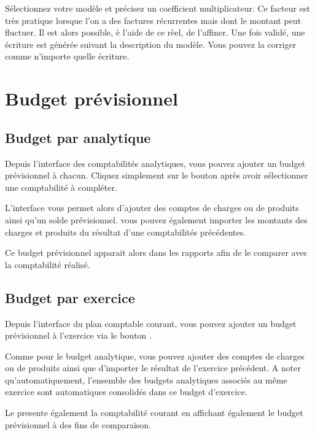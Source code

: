 \documentclass[a4paper,10pt,oneside,french]{sphinxmanual}
\begin{document}
Sélectionnez votre modèle et précisez un coefficient multiplicateur. Ce facteur est très pratique lorsque l’on a des factures récurrentes mais dont le montant peut fluctuer. Il est alors possible, è l’aide de ce rèel, de l’affiner.
Une fois validé, une écriture est générée suivant la description du modèle. Vous pouvez la corriger comme n’importe quelle écriture.


\section{Budget prévisionnel}
\label{\detokenize{accounting/budget::doc}}\label{\detokenize{accounting/budget:budget-previsionnel}}

\subsection{Budget par analytique}
\label{\detokenize{accounting/budget:budget-par-analytique}}
Depuis l’interface des comptabilités analytiques, vous pouvez ajouter un budget prévisionnel à chacun.
Cliquez simplement sur le bouton  après avoir sélectionner une comptabilité à compléter.

L’interface vous permet alors d’ajouter des comptes de charges ou de produits ainsi qu’un solde prévisionnel.
vous pouvez également importer les montants des charges et produits du résultat d’une comptabilités précédentes.

Ce budget prévisionnel apparait alors dans les rapports afin de le comparer avec la comptabilité réalisé.


\subsection{Budget par exercice}
\label{\detokenize{accounting/budget:budget-par-exercice}}
Depuis l’interface du plan comptable courant, vous pouvez ajouter un budget prévisionnel à l’exercice via le bouton .

Comme pour le budget analytique, vous pouvez ajouter des comptes de charges ou de produits ainsi que d’importer le résultat de l’exercice précédent.
A noter qu’automatiquement, l’ensemble des budgets analytiques associés au même exercice sont automatiques consolidés dans ce budget d’exercice.

Le  presente également la comptabilité courant en affichant également le budget prévisionnel à des fins de comparaison.
\end{document}
